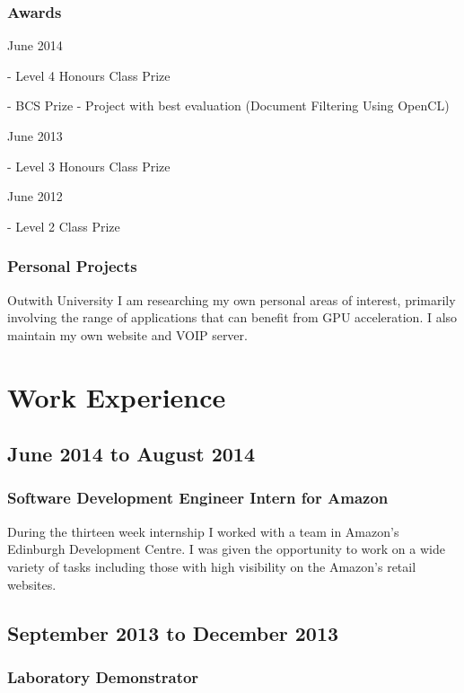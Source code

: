 \documentclass[11pt,a4paper]{article}
\begin{document}
\subsubsection*{Awards}

June 2014

- Level 4 Honours Class Prize

- BCS Prize - Project with best evaluation (Document Filtering Using OpenCL)

June 2013

- Level 3 Honours Class Prize

June 2012

- Level 2 Class Prize

\subsubsection*{Personal Projects}

Outwith University I am researching my own personal areas of interest, primarily
involving the range of applications that can benefit from GPU acceleration. I
also maintain my own website and VOIP server.

\section*{Work Experience}

\subsection*{June 2014 to August 2014}

\subsubsection*{Software Development Engineer Intern for Amazon}

During the thirteen week internship I worked with a team in Amazon's Edinburgh
Development Centre. I was given the opportunity to work on a wide variety of
tasks including those with high visibility on the Amazon's retail websites.

\subsection*{September 2013 to December 2013}

\subsubsection*{Laboratory Demonstrator}
\end{document}

